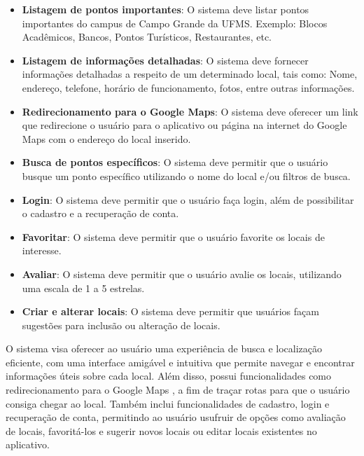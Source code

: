     \begin{itemize}
      \item \textbf{Listagem de pontos importantes}: O sistema deve listar pontos importantes do campus de Campo Grande da UFMS. Exemplo: Blocos Acadêmicos, Bancos, Pontos Turísticos, Restaurantes, etc.
      \item \textbf{Listagem de informações detalhadas}: O sistema deve fornecer informações detalhadas a respeito de um determinado local, tais como: Nome, endereço, telefone, horário de funcionamento, fotos, entre outras informações.
      \item \textbf{Redirecionamento para o Google Maps}:  O sistema deve oferecer um link que redirecione o usuário para o aplicativo ou página na internet do Google Maps \cite{maps2005} com o endereço do local inserido.
      \item \textbf{Busca de pontos específicos}: O sistema deve permitir que o usuário busque um ponto específico utilizando o nome do local e/ou filtros de busca.
      \item \textbf{Login}: O sistema deve permitir que o usuário faça login, além de possibilitar o cadastro e a recuperação de conta.
      \item \textbf{Favoritar}:  O sistema deve permitir que o usuário favorite os locais de interesse.
      \item \textbf{Avaliar}:  O sistema deve permitir que o usuário avalie os locais, utilizando uma escala de 1 a 5 estrelas.
      \item \textbf{Criar e alterar locais}: O sistema deve permitir que usuários façam sugestões para inclusão ou alteração de locais.
    \end{itemize}
    
    O sistema visa oferecer ao usuário uma experiência de busca e localização eficiente, com uma interface amigável e intuitiva que permite navegar e encontrar informações úteis sobre cada local. Além disso, possui funcionalidades como redirecionamento para o Google Maps \cite{maps2005}, a fim de traçar rotas para que o usuário consiga chegar ao local. Também inclui funcionalidades de cadastro, login e recuperação de conta, permitindo ao usuário usufruir de opções como avaliação de locais, favoritá-los e sugerir novos locais ou editar locais existentes no aplicativo.
    